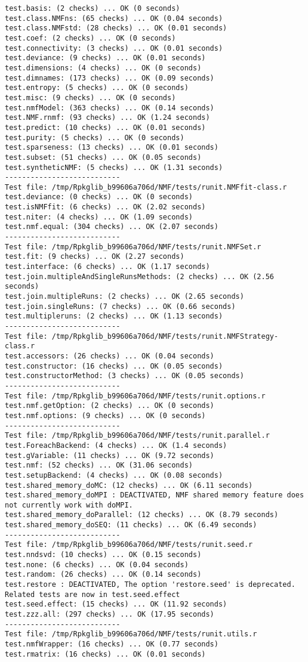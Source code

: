 \documentclass[10pt]{article}
\begin{document}
\begin{verbatim}
test.basis: (2 checks) ... OK (0 seconds)
test.class.NMFns: (65 checks) ... OK (0.04 seconds)
test.class.NMFstd: (28 checks) ... OK (0.01 seconds)
test.coef: (2 checks) ... OK (0 seconds)
test.connectivity: (3 checks) ... OK (0.01 seconds)
test.deviance: (9 checks) ... OK (0.01 seconds)
test.dimensions: (4 checks) ... OK (0 seconds)
test.dimnames: (173 checks) ... OK (0.09 seconds)
test.entropy: (5 checks) ... OK (0 seconds)
test.misc: (9 checks) ... OK (0 seconds)
test.nmfModel: (363 checks) ... OK (0.14 seconds)
test.NMF.rnmf: (93 checks) ... OK (1.24 seconds)
test.predict: (10 checks) ... OK (0.01 seconds)
test.purity: (5 checks) ... OK (0 seconds)
test.sparseness: (13 checks) ... OK (0.01 seconds)
test.subset: (51 checks) ... OK (0.05 seconds)
test.syntheticNMF: (5 checks) ... OK (1.31 seconds)
--------------------------- 
Test file: /tmp/Rpkglib_b99606a706d/NMF/tests/runit.NMFfit-class.r 
test.deviance: (0 checks) ... OK (0 seconds)
test.isNMFfit: (6 checks) ... OK (2.02 seconds)
test.niter: (4 checks) ... OK (1.09 seconds)
test.nmf.equal: (304 checks) ... OK (2.07 seconds)
--------------------------- 
Test file: /tmp/Rpkglib_b99606a706d/NMF/tests/runit.NMFSet.r 
test.fit: (9 checks) ... OK (2.27 seconds)
test.interface: (6 checks) ... OK (1.17 seconds)
test.join.multipleAndSingleRunsMethods: (2 checks) ... OK (2.56 seconds)
test.join.multipleRuns: (2 checks) ... OK (2.65 seconds)
test.join.singleRuns: (7 checks) ... OK (0.66 seconds)
test.multipleruns: (2 checks) ... OK (1.13 seconds)
--------------------------- 
Test file: /tmp/Rpkglib_b99606a706d/NMF/tests/runit.NMFStrategy-class.r 
test.accessors: (26 checks) ... OK (0.04 seconds)
test.constructor: (16 checks) ... OK (0.05 seconds)
test.constructorMethod: (3 checks) ... OK (0.05 seconds)
--------------------------- 
Test file: /tmp/Rpkglib_b99606a706d/NMF/tests/runit.options.r 
test.nmf.getOption: (2 checks) ... OK (0 seconds)
test.nmf.options: (9 checks) ... OK (0 seconds)
--------------------------- 
Test file: /tmp/Rpkglib_b99606a706d/NMF/tests/runit.parallel.r 
test.ForeachBackend: (4 checks) ... OK (1.4 seconds)
test.gVariable: (11 checks) ... OK (9.72 seconds)
test.nmf: (52 checks) ... OK (31.06 seconds)
test.setupBackend: (4 checks) ... OK (0.08 seconds)
test.shared_memory_doMC: (12 checks) ... OK (6.11 seconds)
test.shared_memory_doMPI : DEACTIVATED, NMF shared memory feature does not currently work with doMPI.
test.shared_memory_doParallel: (12 checks) ... OK (8.79 seconds)
test.shared_memory_doSEQ: (11 checks) ... OK (6.49 seconds)
--------------------------- 
Test file: /tmp/Rpkglib_b99606a706d/NMF/tests/runit.seed.r 
test.nndsvd: (10 checks) ... OK (0.15 seconds)
test.none: (6 checks) ... OK (0.04 seconds)
test.random: (26 checks) ... OK (0.14 seconds)
test.restore : DEACTIVATED, The option 'restore.seed' is deprecated. Related tests are now in test.seed.effect
test.seed.effect: (15 checks) ... OK (11.92 seconds)
test.zzz.all: (297 checks) ... OK (17.95 seconds)
--------------------------- 
Test file: /tmp/Rpkglib_b99606a706d/NMF/tests/runit.utils.r 
test.nmfWrapper: (16 checks) ... OK (0.77 seconds)
test.rmatrix: (16 checks) ... OK (0.01 seconds)


\end{verbatim}
\end{document}
